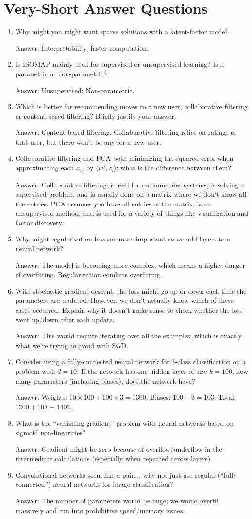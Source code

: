 \documentclass{article}
\def\ans#1{\par\gre{Answer: #1}}
\def\blu#1{{\color{blu}#1}}
\def\gre#1{{\color{gre}#1}}
\def\enum#1{\begin{enumerate}#1\end{enumerate}}
\begin{document}
\section{Very-Short Answer Questions}
\blu{
\enum{
\item Why might you might want sparse solutions with a latent-factor model.
\ans{Interpretability, faster computation.}
\item Is ISOMAP mainly used for supervised or unsupervised learning? Is it parametric or non-parametric?
\ans{Unsupervised; Non-parametric.}
\item Which is better for recommending moves to a new user, collaborative filtering or content-based filtering? Briefly justify your answer.
\ans{Content-based filtering. Collaborative filtering relies on ratings of that user, but there won't be any for a new user.}
\item Collaborative filtering and PCA both minimizing the squared error when approximating each $x_{ij}$ by $\langle w^j, z_i\rangle$; what is the difference between them?
\ans{Collaborative filtering is used for recommender systems, is solving a supervised problem, and is usually done on a matrix where we don't know all the entries. PCA assumes you have all entries of the matrix, is an unsupervised method, and is used for a variety of things like visualization and factor discovery. }
\item{Why might regularization become more important as we add layers to a neural network?}
\ans{The model is becoming more complex, which means a higher danger of overfitting. Regularization combats overfitting.}
\item With stochastic gradient descent, the loss might go up or down each time the parameters are updated. However, we don't actually know which of these cases occurred. Explain why it doesn't make sense to check whether the loss went up/down after each update.
\ans{This would require iterating over all the examples, which is exactly what we're trying to avoid with SGD.}
\item{Consider using a fully-connected neural network for 3-class classification on a problem with $d=10$. If the network has one hidden layer of size $k=100$, how many parameters (including biases), does the network have?}
\ans{Weights: $10\times 100 + 100\times 3=1300$. Biases: $100+3=103$. Total: $1300+103=1403$.}
\item What is the ``vanishing gradient'' problem with neural networks based on sigmoid non-linearities?
\ans{Gradient might be zero because of overflow/underflow in the intermediate calculations (especially when repeated across layers)}
\item{Convolutional networks seem like a pain... why not just use regular (``fully connected'') neural networks for image classification?}
\ans{The number of parameters would be huge; we would overfit massively and run into prohibitive speed/memory issues.}
}
}
\end{document}
